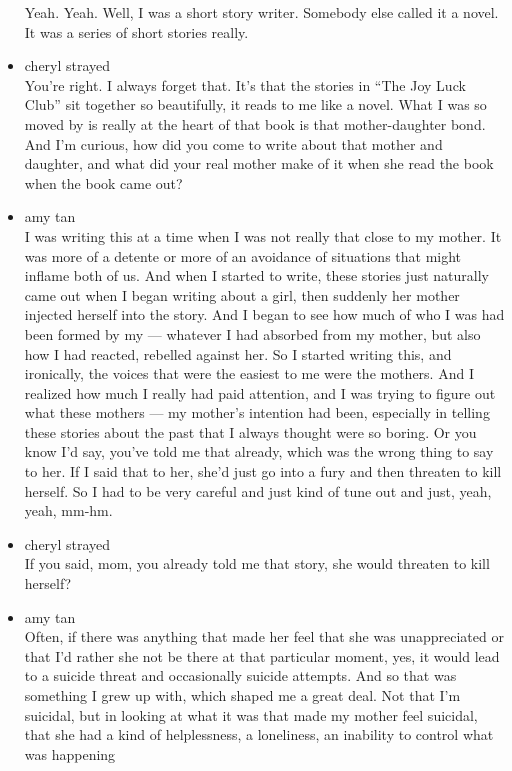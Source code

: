 \begin{itemize}
  Yeah. Yeah. Well, I was a short story writer. Somebody else called it
  a novel. It was a series of short stories really.
\item
  cheryl strayed\\
  You're right. I always forget that. It's that the stories in ``The Joy
  Luck Club'' sit together so beautifully, it reads to me like a novel.
  What I was so moved by is really at the heart of that book is that
  mother-daughter bond. And I'm curious, how did you come to write about
  that mother and daughter, and what did your real mother make of it
  when she read the book when the book came out?
\item
  amy tan\\
  I was writing this at a time when I was not really that close to my
  mother. It was more of a detente or more of an avoidance of situations
  that might inflame both of us. And when I started to write, these
  stories just naturally came out when I began writing about a girl,
  then suddenly her mother injected herself into the story. And I began
  to see how much of who I was had been formed by my --- whatever I had
  absorbed from my mother, but also how I had reacted, rebelled against
  her. So I started writing this, and ironically, the voices that were
  the easiest to me were the mothers. And I realized how much I really
  had paid attention, and I was trying to figure out what these mothers
  --- my mother's intention had been, especially in telling these
  stories about the past that I always thought were so boring. Or you
  know I'd say, you've told me that already, which was the wrong thing
  to say to her. If I said that to her, she'd just go into a fury and
  then threaten to kill herself. So I had to be very careful and just
  kind of tune out and just, yeah, yeah, mm-hm.
\item
  cheryl strayed\\
  If you said, mom, you already told me that story, she would threaten
  to kill herself?
\item
  amy tan\\
  Often, if there was anything that made her feel that she was
  unappreciated or that I'd rather she not be there at that particular
  moment, yes, it would lead to a suicide threat and occasionally
  suicide attempts. And so that was something I grew up with, which
  shaped me a great deal. Not that I'm suicidal, but in looking at what
  it was that made my mother feel suicidal, that she had a kind of
  helplessness, a loneliness, an inability to control what was happening

\end{itemize}

